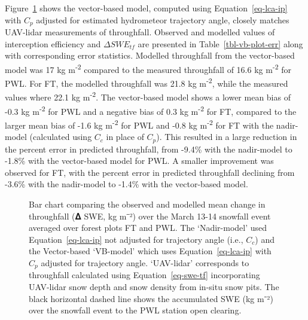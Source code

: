 \documentclass[
  letterpaper,
  DIV=11,
  numbers=noendperiod]{scrartcl}
\begin{document}
Figure~\ref{fig-event-tf} shows the vector-based model, computed using
Equation~\ref{eq-lca-ip} with \(C_p\) adjusted for estimated hydrometeor
trajectory angle, closely matches UAV-lidar measurements of throughfall.
Observed and modelled values of interception efficiency and
\(\Delta SWE_{tf}\) are presented in Table~\ref{tbl-vb-plot-err} along
with corresponding error statistics. Modelled throughfall from the
vector-based model was 17 kg m\textsuperscript{-2} compared to the
measured throughfall of 16.6 kg m\textsuperscript{-2} for PWL. For FT,
the modelled throughfall was 21.8 kg m\textsuperscript{-2}, while the
measured values where 22.1 kg m\textsuperscript{-2}. The vector-based
model shows a lower mean bias of -0.3 kg m\textsuperscript{-2} for PWL
and a negative bias of 0.3 kg m\textsuperscript{-2} for FT, compared to
the larger mean bias of -1.6 kg m\textsuperscript{-2} for PWL and -0.8
kg m\textsuperscript{-2} for FT with the nadir-model (calculated using
\(C_c\) in place of \(C_p\)). This resulted in a large reduction in the
percent error in predicted throughfall, from -9.4\% with the nadir-model
to -1.8\% with the vector-based model for PWL. A smaller improvement was
observed for FT, with the percent error in predicted throughfall
declining from -3.6\% with the nadir-model to -1.4\% with the
vector-based model.

\begin{figure}[H]


\caption{\label{fig-event-tf}Bar chart comparing the observed and
modelled mean change in throughfall (𝚫 SWE, kg m⁻²) over the March 13-14
snowfall event averaged over forest plots FT and PWL. The `Nadir-model'
used Equation~\ref{eq-lca-ip} not adjusted for trajectory angle (i.e.,
\(C_c\)) and the Vector-based `VB-model' which uses
Equation~\ref{eq-lca-ip} with \(C_p\) adjusted for trajectory angle.
`UAV-lidar' corresponds to throughfall calculated using
Equation~\ref{eq-swe-tf} incorporating UAV-lidar snow depth and snow
density from in-situ snow pits. The black horizontal dashed line shows
the accumulated SWE (kg m⁻²) over the snowfall event to the PWL station
open clearing.}

\end{figure}%
\end{document}
